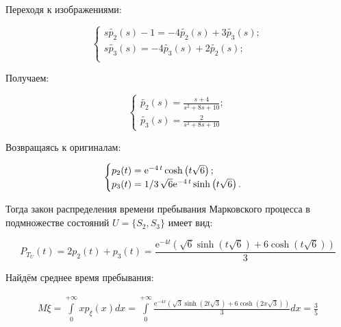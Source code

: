 \documentclass[14pt,a4paper]{scrartcl}
\begin{document}
Переходя к изображениями:

\begin{equation*}
	\begin{cases}
		s\widetilde{p_2}(s) - 1 = -4\widetilde{p_2}(s) + 3\widetilde{p_3}(s);\\
		s\widetilde{p_3}(s) = -4\widetilde{p_3}(s) + 2\widetilde{p_2}(s);\\
	\end{cases}
\end{equation*}

Получаем:

\begin{equation*}
	\begin{cases}
		\widetilde{p_2}(s) = \frac{s+4}{s^{2}+8 s+10};\\
		\widetilde{p_3}(s) = \frac{2}{s^{2}+8 s+10}
	\end{cases}
\end{equation*}


Возвращаясь к оригиналам:

\begin{equation*}
	\begin{cases}
		p_2(t) = {{\rm e}^{-4\,t}}\cosh \left( t\sqrt {6} \right) ; \\
		p_3(t) = 1/3\,\sqrt {6}{{\rm e}^{-4\,t}}\sinh \left( t\sqrt {6} \right) .
	\end{cases}
\end{equation*}

Тогда закон распределения времени пребывания Марковского процесса в подмножестве состояний $U = \{S_2,S_3\}$ имеет вид:

\begin{equation*}
	P_{T_{U}}(t) = 2p_2(t) + p_3(t) = \frac{\mathrm{e}^{-4 t}(\sqrt{6} \sinh (t \sqrt{6})+6 \cosh (t \sqrt{6}))}{3}
\end{equation*}


Найдём среднее время пребывания:

\begin{equation*}
	\begin{aligned}
		M \xi=\int\limits_{0}^{+\infty} x p_{\xi}(x) dx = \int\limits_{0}^{+\infty} \frac{\mathrm{e}^{-4 x}(\sqrt{3} \sinh (2 t \sqrt{3})+6 \cosh (2 x \sqrt{3}))}{3} dx = \frac{3}{5}
		\\
	\end{aligned}
\end{equation*}
\end{document}
